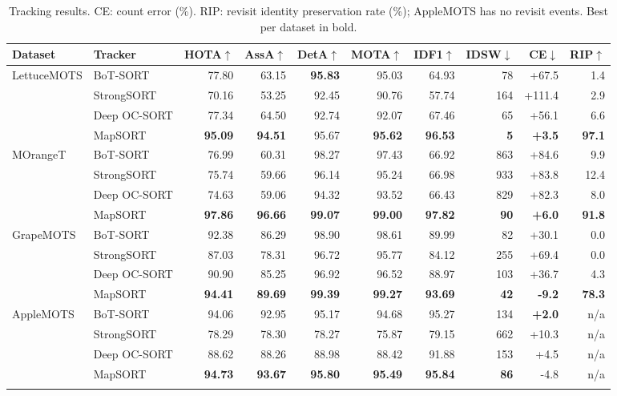 \documentclass[pdflatex,sn-basic]{sn-jnl}%
\theoremstyle{thmstyleone}%
\begin{document}
\begin{table}[t]
\caption{Tracking results. CE: count error (\%). RIP: revisit identity preservation rate (\%); AppleMOTS has no revisit events. Best per dataset in bold.}\label{tab:main}
\footnotesize
\setlength{\tabcolsep}{3.5pt}
\begin{tabular*}{\textwidth}{@{\extracolsep\fill}llrrrrrrrr@{}}
\toprule
Dataset & Tracker & HOTA$\uparrow$ & AssA$\uparrow$ & DetA$\uparrow$ & MOTA$\uparrow$ & IDF1$\uparrow$ & IDSW$\downarrow$ & CE$\downarrow$ & RIP$\uparrow$ \\
\midrule
\multirow{4}{*}{LettuceMOTS} & BoT-SORT & 77.80 & 63.15 & \textbf{95.83} & 95.03 & 64.93 & 78 & +67.5 & 1.4 \\
 & StrongSORT & 70.16 & 53.25 & 92.45 & 90.76 & 57.74 & 164 & +111.4 & 2.9 \\
 & Deep OC-SORT & 77.34 & 64.50 & 92.74 & 92.07 & 67.46 & 65 & +56.1 & 6.6 \\
 & MapSORT & \textbf{95.09} & \textbf{94.51} & 95.67 & \textbf{95.62} & \textbf{96.53} & \textbf{5} & \textbf{+3.5} & \textbf{97.1} \\
\midrule
\multirow{4}{*}{MOrangeT} & BoT-SORT & 76.99 & 60.31 & 98.27 & 97.43 & 66.92 & 863 & +84.6 & 9.9 \\
 & StrongSORT & 75.74 & 59.66 & 96.14 & 95.24 & 66.98 & 933 & +83.8 & 12.4 \\
 & Deep OC-SORT & 74.63 & 59.06 & 94.32 & 93.52 & 66.43 & 829 & +82.3 & 8.0 \\
 & MapSORT & \textbf{97.86} & \textbf{96.66} & \textbf{99.07} & \textbf{99.00} & \textbf{97.82} & \textbf{90} & \textbf{+6.0} & \textbf{91.8} \\
\midrule
\multirow{4}{*}{GrapeMOTS} & BoT-SORT & 92.38 & 86.29 & 98.90 & 98.61 & 89.99 & 82 & +30.1 & 0.0 \\
 & StrongSORT & 87.03 & 78.31 & 96.72 & 95.77 & 84.12 & 255 & +69.4 & 0.0 \\
 & Deep OC-SORT & 90.90 & 85.25 & 96.92 & 96.52 & 88.97 & 103 & +36.7 & 4.3 \\
 & MapSORT & \textbf{94.41} & \textbf{89.69} & \textbf{99.39} & \textbf{99.27} & \textbf{93.69} & \textbf{42} & \textbf{-9.2} & \textbf{78.3} \\
\midrule
\multirow{4}{*}{AppleMOTS} & BoT-SORT & 94.06 & 92.95 & 95.17 & 94.68 & 95.27 & 134 & \textbf{+2.0} & n/a \\
 & StrongSORT & 78.29 & 78.30 & 78.27 & 75.87 & 79.15 & 662 & +10.3 & n/a \\
 & Deep OC-SORT & 88.62 & 88.26 & 88.98 & 88.42 & 91.88 & 153 & +4.5 & n/a \\
 & MapSORT & \textbf{94.73} & \textbf{93.67} & \textbf{95.80} & \textbf{95.49} & \textbf{95.84} & \textbf{86} & -4.8 & n/a \\
\botrule
\end{tabular*}
\end{table}
\end{document}
